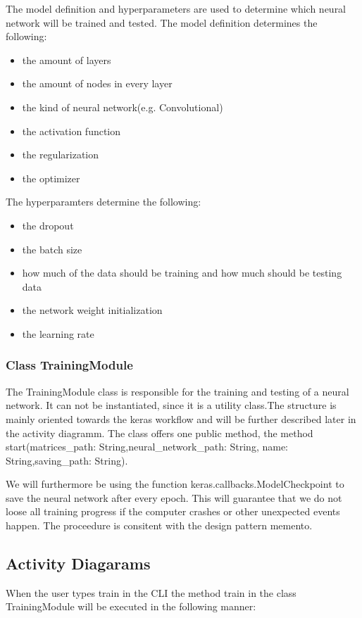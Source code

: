 \documentclass[parskip=full]{scrartcl}
\begin{document}
The model definition and hyperparameters are used to determine which neural network will be trained and tested. The model definition determines the following:
\begin{itemize}
\item the amount of layers
\item the amount of nodes in every layer
\item the kind of neural network(e.g. Convolutional)
\item the activation function
\item the regularization
\item the optimizer
\end{itemize}

The hyperparamters determine the following:

\begin{itemize}
\item the dropout
\item the batch size
\item how much of the data should be training and how much should be testing data
\item the network weight initialization
\item the learning rate
\end{itemize}

\subsubsection{Class TrainingModule}
The TrainingModule class is responsible for the training and testing of a neural network.
It can not be instantiated, since it is a utility class.The structure is mainly oriented towards the keras workflow and will be further described later in the activity diagramm.
The class offers one public method, the method start(matrices\_path: String,neural\_network\_path: String,
name: String,saving\_path: String). \newline

We will furthermore be using the function keras.callbacks.ModelCheckpoint to save the neural network after every epoch. This will guarantee that we do not loose all training progress if the computer crashes or other unexpected events happen. The proceedure is consitent with the design pattern \gls{memento}.


\subsection{Activity Diagarams}
When the user types train in the CLI the method train in the class TrainingModule will be executed in the following manner:
\end{document}
